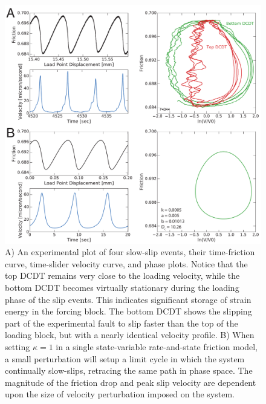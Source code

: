 \begin{figure}[H]
	\centering
		\includegraphics[scale=0.35]{chap_slow_slip_details/Figure_11.pdf}
   	\caption{A) An experimental plot of four slow-slip events, their time-friction curve, time-slider velocity curve, and phase plots. Notice that the top DCDT remains very close to the loading velocity, while the bottom DCDT becomes virtually stationary during the loading phase of the slip events. This indicates significant storage of strain energy in the forcing block. The bottom DCDT shows the slipping part of the experimental fault to slip faster than the top of the loading block, but with a nearly identical velocity profile. B) When setting $\kappa  = 1$ in a single state-variable rate-and-state friction model, a small perturbation will setup a limit cycle in which the system continually slow-slips, retracing the same path in phase space. The magnitude of the friction drop and peak slip velocity are dependent upon the size of velocity perturbation imposed on the system.}
  	\label{Figure_11}
\end{figure}

\clearpage

